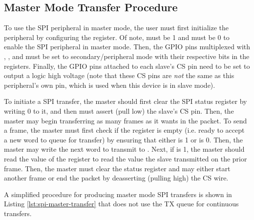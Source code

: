 \subsection{Master Mode Transfer Procedure}

To use the SPI peripheral in master mode, the user must first initialize the  peripheral by configuring the  register. Of note,  must be 1 and  must be 0 to enable the SPI peripheral in master mode. Then, the GPIO pins multiplexed with , , and  must be set to secondary/peripheral mode with their respective bits in the  registers. Finally, the GPIO pins attached to each slave's CS pin need to be set to output a logic high voltage (note that these CS pins are \textit{not} the same as this  peripheral's own  pin, which is used when this device is in slave mode).

To initiate a SPI transfer, the master should first clear the SPI status register  by writing 0 to it, and then must assert (pull low) the slave's CS pin. Then, the master may begin transferring as many frames as it wants in the packet. To send a frame, the master must first check if the  register is empty (i.e. ready to accept a new word to queue for transfer) by ensuring that either  is 1 or  is 0. Then, the master may write the next word to transmit to . Next, if  is 1, the master should read the value of the  register to read the value the slave transmitted on the prior frame. Then, the master must clear the status register and may either start another frame or end the packet by deasserting (pulling high) the CS wire.

A simplified procedure for producing master mode SPI transfers is shown in Listing \ref{lst:spi-master-transfer} that does not use the TX queue for continuous transfers.

